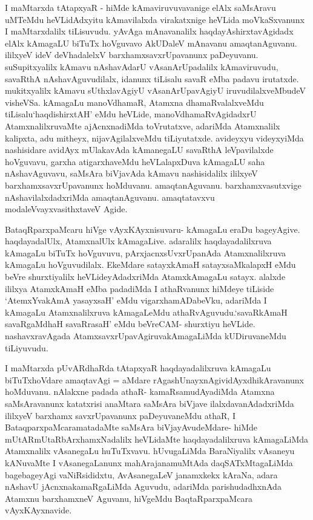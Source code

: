 \begin{artha}
I maMtarxda tAtapxyaR - hiMde kAmaviruvuvavanige elAlx saMsAravu uMTeMdu heVLidAdxyitu kAmavilalxda virakatxnige heVLida moVkaSxvanunx I maMtarxdalilx tiLisuvudu. yAvAga mAnavanalilx haqdayAshirxtavAgidadx elAlx kAmagaLU biTuTx hoVguvavo AkUDaleV mAnavanu amaqtanAguvanu. ililxyeV ideV deVhadalelxV barxhamxsavxrUpavanunx paDeyuvanu. suSupitxyalilx kAmavu nAshavAdarU vAsanA\-rUpadalilx kAmaviruvudu, savaRthA nAshavAguvudilalx, idanunx tiLisalu savaR eMba padavu irutatxde. mukitxyalilx kAmavu sUthxlavAgiyU vAsanArUpavAgiyU iruvudilalxveMbudeV visheVSa. kAmagaLu manoVdhamaR, Atamxna dhamaRvalalxveMdu tiLisalu\break `haqdishirxtAH' eMdu heVLide, manoVdhamaRvAgidadxrU AtamxnalilxruvaMte ajAcnxnadiMda toVrutatxve, adariMda Atamxnalilx kalipxta, adu mitheyx, nijavAgilalxveMdu tiLiyutatxde. avideyxyu videyxyiMda nashisidare avidAyx mUlakavAda kAmanegaLU savaRthA leVpavilalxde hoVguvavu, garxha atigarxhaveMdu heVLalapxDuva kAmagaLU saha nAshavAguvavu, saMsAra biVjavAda kAmavu nashisidalilx ililxyeV barxhamxsavxrUpavanunx hoMduvanu. amaqtanAguvanu. barxhamxvasutxvige nAshavilalxdadxriMda amaqtanAguvanu. amaqtatavxvu modaleV\break vayxvasithxtaveV Agide.
\end{artha}


\begin{artha}
BataqRparxpaMcaru hiVge vAyxKAyxnisuvaru- kAmagaLu eraDu bageyAgive. haqdayadalUlx, AtamxnalUlx kAmagaLive. adaralilx haqdayadalilxruva kAmagaLu biTuTx hoVguvuvu, pArxjacnxsUvxrUpanAda Atamxnalilxruva kAmagaLu hoVguvudilalx. EkeMdare satayxkAmaH satayxsaMkalapxH eMdu beVre shurxtiyalilx heVLideyAdadxriMda AtamxkAmagaLu satayx. alalxde ililxya AtamxkAmaH eMba padadiMda I athaRvanunx hiMdeye tiLiside `AtemxYvakAmA yasayxsaH' eMdu vigarxhamADabeVku, adariMda I kAmagaLu Atamxnalilxruva kAmagaLeMdu athaRvAguvudu.\break `savaRkAmaH savaRgaMdhaH savaRrasaH' eMdu beVreCAM- shurxtiyu heVLide. nashavxravAgada AtamxsavxrUpavAgiruvakAmagaLiMda kUDiruvaneMdu tiLiyuvudu.

I maMtarxda pUvARdhaRda tAtapxyaR haqdayadalilxruva kAmagaLu biTuTxhoVdare amaqtavAgi = aMdare rAgashUnayxnAgi\break vidAyxdhikAravanunx hoMduvanu. nAlakxne padada athaR- kamaRsamudAyadiMda Atamxna saMsAravanunx katatxrisi anaMtara saMsAra biVjave ilalxdavanAdadxriMda ililxyeV barxhamx savxrUpavanunx paDeyuvaneMdu athaR, I BataqparxpaMcaramatadaMte saMsAra biVjayAvudeMdare- hiMde mUtARmUtaRbArxhamxNadalilx heVLidaMte haqdayadalilxruva kAmagaLiMda Atamxnalilx vAsanegaLu huTuTxvavu. hUvugaLiMda BaraNiyalilx vAsaneyu kANuvaMte I vAsanegaLanunx mahArajanamuMtAda daqSATxMtagaLiMda bagebageyAgi vaNiRsididxtu, AvAsanegaLeV janamxkekx kAraNa, adara nAshavU jAcnxnakamaRgaLiMda Aguvudu, adariMda parishudadhxnAda Atamxnu barxhamxneV Aguvanu, hiVgeMdu BaqtaRparxpaMcara vAyxKAyxnavide.
\end{artha}

